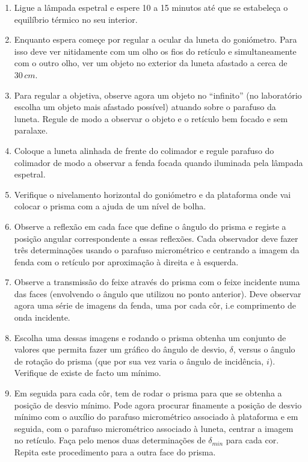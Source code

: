 \documentclass[a4paper,12pt]{article}  %
\begin{document}
\begin{enumerate}
\item Ligue  a  lâmpada  espetral  e  espere  10  a  15  minutos    até  que  se  estabeleça  o 
equilíbrio térmico no seu interior. 
\item Enquanto espera começe por regular a ocular da luneta do goniómetro. Para isso deve ver nitidamente com um 
olho  os fios do retículo e simultaneamente com o outro olho, ver um objeto no exterior da luneta afastado a cerca de 
$30\,cm$.  
\item Para  regular  a  objetiva,  observe  agora  um  objeto  no  “infinito” (no  laboratório 
escolha  um objeto  mais  afastado possível)  atuando  sobre  o  parafuso  da  luneta.  Regule  de  modo  a 
observar o objeto e o retículo bem focado e sem paralaxe. 
\item Coloque  a  luneta  alinhada de frente  do  colimador  e  regule  parafuso  do 
colimador de modo a observar a fenda focada quando iluminada pela lâmpada espetral. 
\item Verifique o nivelamento horizontal do goniómetro e da plataforma onde vai colocar o prisma com a ajuda de um nível de bolha. 
\item Observe a reflexão em cada face que define o ângulo do prisma e registe a posição angular 
correspondente a essas reflexões. Cada observador deve fazer três determinações usando o 
parafuso  micrométrico e centrando  a  imagem  da  fenda  com  o retículo  por  aproximação  à 
direita e à esquerda. 
\item  Observe  a  transmissão  do  feixe  através  do  prisma  com  o  feixe  incidente  numa  das  faces 
(envolvendo  o  ângulo  que  utilizou  no  ponto  anterior).  Deve  observar  agora  uma  série  de 
imagens da fenda, uma por cada côr, i.e comprimento de onda incidente.
\item Escolha uma dessas imagens e rodando o prisma obtenha um conjunto de valores que permita fazer um gráfico do ângulo de desvio, $\delta$, 
versus o ângulo de rotação do prisma (que por sua vez varia o ângulo de incidência, $i$). Verifique de existe de facto um mínimo.  
\item  Em seguida para cada côr, tem de rodar o prisma para que se obtenha a posição de desvio mínimo. Pode agora procurar finamente a posição de desvio mínimo 
com  o auxílio  do  parafuso  micrométrico  associado  à  plataforma  e  em  seguida,  com  o 
parafuso micrométrico associado à luneta, centrar a imagem no retículo. Faça pelo menos 
duas determinações de $\delta_{min}$ para cada cor. Repita este procedimento para a outra face do prisma. 

\end{enumerate}
\end{document}
